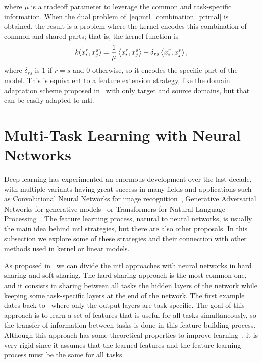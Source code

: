 where $\mu$ is a tradeoff parameter to leverage the common and task-specific information.
%
When the dual problem of~\eqref{eq:mtl_combination_primal} is obtained, the result is a problem where the kernel encodes this combination of common and shared parts; that is, the kernel function is
\begin{equation}
    \nonumber
    k(x_i^r, x_j^s) = \frac{1}{\mu} \bm{\left\langle} x_i^r, x_j^s \bm{\right\rangle} +  \delta_{rs} \bm{\left\langle} x_i^r, x_j^s \bm{\right\rangle} ,
\end{equation}
where $\delta_{rs}$ is $1$ if $r=s$ and $0$ otherwise, so it encodes the specific part of the model. This is equivalent to a feature extension strategy, like the domain adaptation scheme proposed in~\cite{Daume07} with only target and source domains, but that can be easily adapted to \acrshort{mtl}.




\section{Multi-Task Learning with Neural Networks}\label{sec:deep_mtl}
Deep learning has experimented an enormous development over the last decade, with multiple variants having great success in many fields and applications such as Convolutional Neural Networks for image recognition~\citep*{KrizhevskySH12}, Generative Adversarial Networks for generative models~\citep{GoodfellowPMXWOCB14} or Transformers for Natural Language Processing~\citep{VaswaniSPUJGKP17}. 
The feature learning process, natural to neural networks, is usually the main idea behind \acrshort{mtl} strategies, but there are also other proposals.
In this subsection we explore some of these strategies and their connection with other methods used in kernel or linear models.

As proposed in~\cite{Ruder17a} we can divide the \acrshort{mtl} approaches with neural networks in hard sharing and soft sharing.
The hard sharing approach is the most common one, and it consists in sharing between all tasks the hidden layers of the network while keeping some task-specific layers at the end of the network. The first example dates back to~\cite{Caruana97} where only the output layers are task-specific. The goal of this approach is to learn a set of features that is useful for all tasks simultaneously, so the transfer of information between tasks is done in this feature building process. Although this approach has some theoretical properties to improve learning~\citep{baxter2000model}, it is very rigid since it assumes that the learned features and the feature learning process must be the same for all tasks.

